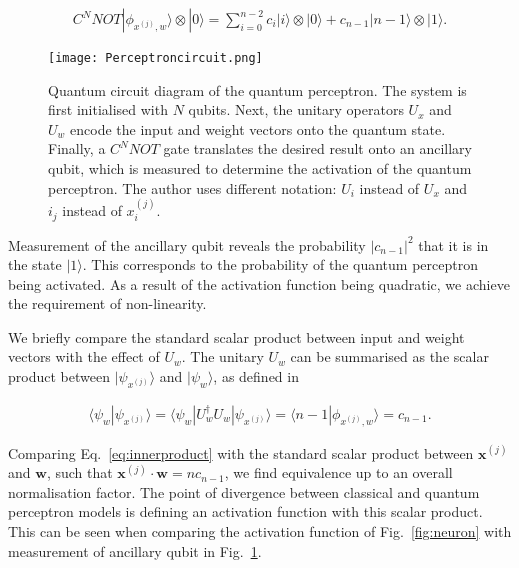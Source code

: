 \documentclass[twocolumn,superscriptaddress]{revtex4-1}
\begin{document}
\begin{equation} \label{eq:ancillary}
\begin{split}
C^NNOT|\phi_{x^{(j)},w} \rangle \otimes |0 \rangle = \sum_{i=0}^{n-2} c_i |i \rangle \otimes {|0 \rangle} + c_{n-1} |n-1 \rangle \otimes {|1\rangle} .
\end{split}
\end{equation}

\begin{figure}[t!]
\texttt{[image: Perceptroncircuit.png]}
\caption{Quantum circuit diagram of the quantum perceptron. The system is first initialised with $N$ qubits. Next, the unitary operators $U_x$ and $U_w$ encode the input and weight vectors onto the quantum state. Finally, a $C^NNOT$ gate translates the desired result onto an ancillary qubit, which is measured to determine the activation of the quantum perceptron. The author uses different notation: $U_i$ instead of $U_x$ and $i_j$ instead of $x^{(j)}_i$\cite{Tacchino_2019}.}
\label{fig:Perceptroncircuit}
\end{figure}

Measurement of the ancillary qubit reveals the probability $|c_{n-1}|^2$ that it is in the state $|1 \rangle$. This corresponds to the probability of the quantum perceptron being activated. As a result of the activation function being quadratic, we achieve the requirement of non-linearity. 

We briefly compare the standard scalar product between input and weight vectors with the effect of $U_w$. The unitary $U_w$ can be summarised as the scalar product between $|\psi _{x^{(j)}} \rangle$ and $|\psi _w \rangle$, as defined in

\begin{equation} \label{eq:innerproduct}
\begin{split}
\langle \psi_w | \psi _{x^{(j)}} \rangle = \langle \psi_w | U_w^{\dagger} U_w | \psi _{x^{(j)}} \rangle = \langle n - 1 |\phi_{x^{(j)},w} \rangle = c_{n-1}.
\end{split}
\end{equation}

Comparing Eq.~\ref{eq:innerproduct} with the standard scalar product between $\bm{x}^{(j)}$ and $\bm{w}$, such that $ \bm{x}^{(j)} \cdot \bm{w} = nc_{n-1}$, we find equivalence up to an overall normalisation factor. The point of divergence between classical and quantum perceptron models is defining an activation function with this scalar product. This can be seen when comparing the activation function of Fig.~\ref{fig:neuron} with measurement of ancillary qubit in Fig.~\ref{fig:Perceptroncircuit}.
\end{document}
